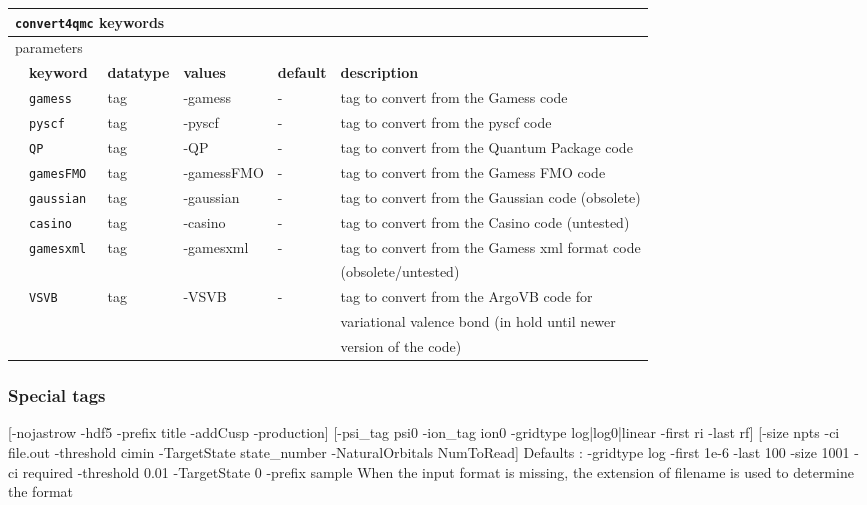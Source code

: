 \begin{table}[h]
\begin{center}
\begin{tabularx}{\textwidth}{l l l l l l }
\hline
\multicolumn{6}{l}{\texttt{convert4qmc} keywords} \\
\hline
\multicolumn{2}{l}{parameters}  & \multicolumn{4}{l}{}\\
   &   \bfseries keyword     & \bfseries datatype & \bfseries values & \bfseries default   & \bfseries description \\
   &   \texttt{gamess             } &  tag  & -gamess & -   & tag to convert from the Gamess code\\
   &   \texttt{pyscf             } &  tag  & -pyscf & -   & tag to convert from the pyscf code\\
   &   \texttt{QP             } &  tag  & -QP & -   & tag to convert from the Quantum Package code\\
   &   \texttt{gamesFMO             } &  tag  & -gamessFMO & -   & tag to convert from the Gamess FMO code\\
   &   \texttt{gaussian             } &  tag  & -gaussian & -   & tag to convert from the Gaussian code (obsolete) \\
   &   \texttt{casino             } &  tag  & -casino & -   & tag to convert from the Casino code (untested)\\
   &   \texttt{gamesxml             } &  tag  & -gamesxml & -   & tag to convert from the Gamess xml format code\\ &&&&&  (obsolete/untested)\\
   &   \texttt{VSVB             } &  tag  & -VSVB & -   & tag to convert from the ArgoVB code for \\ &&&&&variational valence bond  (in hold until newer\\ &&&&& version of the code)\\
    \hline

    \end{tabularx}
\end{center}
\end{table}

\subsubsection{Special tags}

[-nojastrow -hdf5 -prefix title -addCusp -production]                                                                                           
[-psi_tag psi0 -ion_tag ion0 -gridtype log|log0|linear -first ri -last rf]
[-size npts -ci file.out -threshold cimin -TargetState state_number
-NaturalOrbitals NumToRead]                                        
Defaults : -gridtype log -first 1e-6 -last 100 -size 1001 -ci required 
-threshold 0.01 -TargetState 0 -prefix sample                                
When the input format is missing, the  extension of filename is used to determine
the format                                                      

